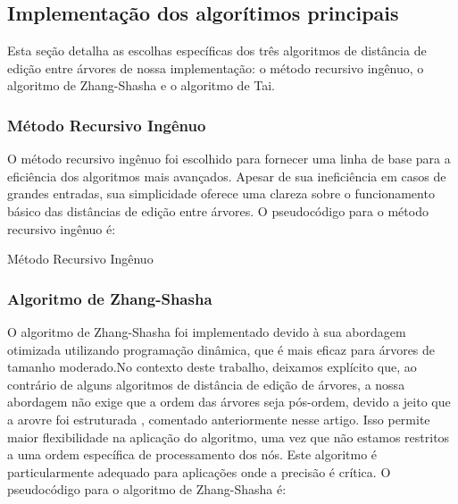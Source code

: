 \documentclass[12pt]{article}
\begin{document}
\subsection{Implementação dos algorítimos principais}

Esta seção detalha as escolhas específicas dos três algoritmos de distância de edição entre árvores de nossa implementação: o método recursivo ingênuo, o algoritmo de Zhang-Shasha e o algoritmo de Tai.
\subsubsection{Método Recursivo Ingênuo}

O método recursivo ingênuo foi escolhido para fornecer uma linha de base para a eficiência dos algoritmos mais avançados. Apesar de sua ineficiência em casos de grandes entradas, sua simplicidade oferece uma clareza sobre o funcionamento básico das distâncias de edição entre árvores. O pseudocódigo para o método recursivo ingênuo é:



\begin{algorithm}[H]
\caption{Método Recursivo Ingênuo}
\end{algorithm}
\newpage
\subsubsection{Algoritmo de Zhang-Shasha}

O algoritmo de Zhang-Shasha foi implementado devido à sua abordagem otimizada utilizando programação dinâmica, que é mais eficaz para árvores de tamanho moderado.No contexto deste trabalho, deixamos explícito que, ao contrário de alguns algoritmos de distância de edição de árvores, a nossa abordagem não exige que a ordem das árvores seja pós-ordem, devido a jeito que a arovre foi estruturada , comentado anteriormente nesse artigo. Isso permite maior flexibilidade na aplicação do algoritmo, uma vez que não estamos restritos a uma ordem específica de processamento dos nós. Este algoritmo é particularmente adequado para aplicações onde a precisão é crítica. O pseudocódigo para o algoritmo de Zhang-Shasha é:
\end{document}

